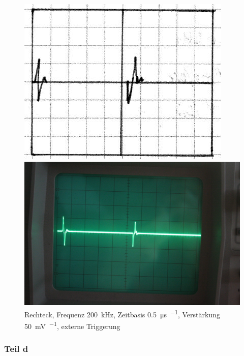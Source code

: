\begin{figure}
	\centering
	\begin{minipage}{.45\linewidth}
	\includegraphics[width=\linewidth]{Skizzen/IMG_0768-1500.jpg}
	\end{minipage}
	\hfill
	\begin{minipage}{.45\linewidth}
	\includegraphics[width=\linewidth]{Fotos/IMG_0768-1500.jpg}
	\end{minipage}
	\caption{%
		Rechteck, Frequenz \SI{200}{\kilo\hertz},
		Zeitbasis \SI{.5}{\micro\second\per\division},
		Verstärkung \SI{50}{\milli\volt\per\division},
		externe Triggerung
	}
	\label{fig:0768}
\end{figure}

\FloatBarrier
\subsubsection{Teil d}

